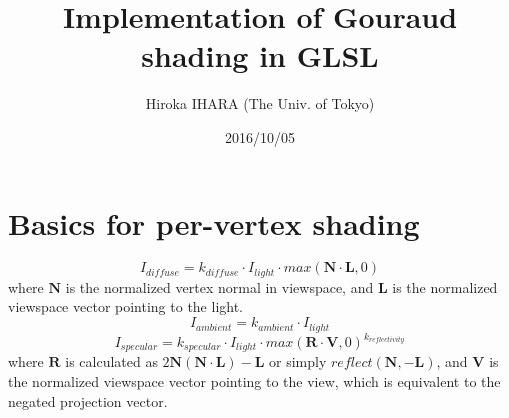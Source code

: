 \documentclass[a4paper]{article}
\title{Implementation of Gouraud shading in GLSL}
\author{Hiroka IHARA (The Univ. of Tokyo)}
\date{2016/10/05}
\begin{document}
\maketitle
\section{Basics for per-vertex shading}
\[
I_{diffuse} = k_{diffuse} \cdot I_{light} \cdot max \left( \bm{N} \cdot \bm{L}, 0 \right)
\]
where $\bm{N}$ is the normalized vertex normal in viewspace, and $\bm{L}$ is the normalized viewspace vector pointing to the light.
\[
I_{ambient} = k_{ambient} \cdot I_{light}
\]
\[
I_{specular} = k_{specular} \cdot I_{light} \cdot max \left( \bm{R} \cdot \bm{V}, 0 \right)^{k_{reflectivity}}
\]
where $\bm{R}$ is calculated as $2\bm{N}\left(\bm{N}\cdot\bm{L}\right)-\bm{L}$ or simply $reflect\left(\bm{N},-\bm{L}\right)$,
and $\bm{V}$ is the normalized viewspace vector pointing to the view, which is equivalent to the negated projection vector.
\end{document}
